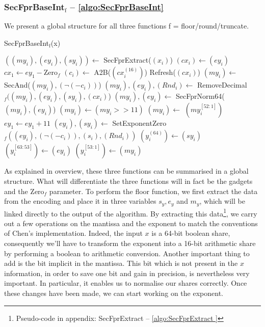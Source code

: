 \documentclass[runningheads]{llncs}
\begin{document}
    
      \subsubsection{SecFprBaseInt$_\text{f}$ -- \autoref{algo:SecFprBaseInt}}
      We present a global structure for all three functions f = floor/round/truncate.

      \begin{algorithm}[H]
        \caption{SecFprBaseInt$_\text{f}$(x)}
        \label{algo:SecFprBaseInt}
        $((my_i), (ey_i), (sy_i)) \leftarrow$ SecFprExtract($(x_i)$)\;%
        $(cx_i) \leftarrow (ey_i)$\;
        $cx_1 \leftarrow ey_1 - \text{Zero}_f$\;%
        $(c_i) \leftarrow$ A2B($(cx_i^{(16)})$)\; 
        Refresh($(cx_i)$)\;
        $(my_i) \leftarrow$ SecAnd($(my_i), (\neg(-c_i))$)\;%
        $(my_i), (ey_i), (Rnd_i) \leftarrow$ RemoveDecimal$_f((my_i), (ey_i), (sy_i), (cx_i)$)\;%
        $(my_i), (ey_i) \leftarrow$ SecFprNorm64($(my_i),(ey_i)$)\;
        $(my_i) \leftarrow (my_i >> 11)$\;
        $(my_i) \leftarrow$ $(my_i^{[52:1]}) $\;
        $ey_1 \leftarrow ey_1 + 11$\;
        $(ey_i), (sy_i) \leftarrow$ SetExponentZero$_f((ey_i), (\neg(-c_i)), (s_i), (Rnd_i))$\;%
        $(y_i^{(64)}) \leftarrow (sy_i) $\;
        $(y_i^{[63:53]}) \leftarrow (ey_i) $\;
        $(y_i^{[53:1]}) \leftarrow (my_i) $\;
      \;
      \end{algorithm}
      As explained in overview, these three functions can be summarised in a global structure. 
      What will differentiate the three functions will in fact be the gadgets and the Zero$_f$ parameter.
      To perform the floor function, we first extract the data from the encoding and place it in three variables $s_y, e_y$ and $m_y$, which will be linked directly to the output of the algorithm. 
      By extracting this data\footnote{Pseudo-code in appendix: SecFprExtract -- \autoref{algo:SecFprExtract }}, we carry out a few operations on the mantissa and the exponent to match the conventions of Chen's implementation.
        Indeed, the input $x$ is a 64-bit boolean share, consequently we'll have to transform the exponent into a 16-bit arithmetic share by performing a boolean to arithmetic conversion.
        Another important thing to add is the bit implicit in the mantissa. 
        This bit which is not present in the $x$ information, in order to save one bit and gain in precision, is nevertheless very important.
        In particular, it enables us to normalise our shares correctly.
        Once these changes have been made, we can start working on the exponent.
\end{document}
